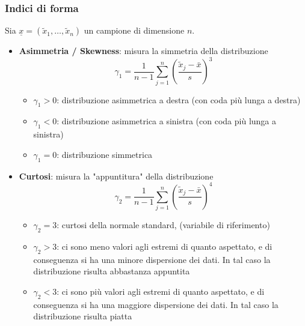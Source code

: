 \documentclass[a4paper]{article}
\theoremstyle{break}
\theoremstyle{break}
\theoremstyle{break}
\theoremstyle{break}
\begin{document}
\subsubsection{Indici di forma}
Sia \( \underline{x} = (\tilde{x}_1, \ldots, \tilde{x}_n) \) un campione di dimensione
\( n \).
\begin{itemize}
	\item \textbf{Asimmetria / Skewness}: misura la simmetria della distribuzione
	      \[
		      \gamma_1 = \frac{1}{n-1} \sum_{j=1}^{n} \left( \frac{\tilde{x}_j - \bar{x}}{s} \right)^3
	      \]
	      \begin{itemize}
		      \item \( \gamma_1 > 0 \): distribuzione asimmetrica a destra (con coda più lunga
		            a destra)
		      \item \( \gamma_1 < 0 \): distribuzione asimmetrica a sinistra (con coda più
		            lunga a sinistra)
		      \item \( \gamma_1 = 0 \): distribuzione simmetrica
	      \end{itemize}
	\item \textbf{Curtosi}: misura la "appuntitura" della distribuzione
	      \[
		      \gamma_2 = \frac{1}{n-1} \sum_{j=1}^{n} \left( \frac{\tilde{x}_j - \bar{x}}{s} \right)^4
	      \]
	      \begin{itemize}
		      \item \( \gamma_2 = 3 \): curtosi della normale standard, (variabile di riferimento)
		      \item \( \gamma_2 > 3 \): ci sono meno valori agli estremi di quanto aspettato, e
		            di conseguenza si ha una minore dispersione dei dati. In tal caso la distribuzione
		            risulta abbastanza appuntita
		      \item \( \gamma_2 < 3 \): ci sono più valori agli estremi di quanto aspettato, e
		            di conseguenza si ha una maggiore dispersione dei dati. In tal caso la distribuzione
		            risulta piatta
	      \end{itemize}
\end{itemize}
\end{document}
